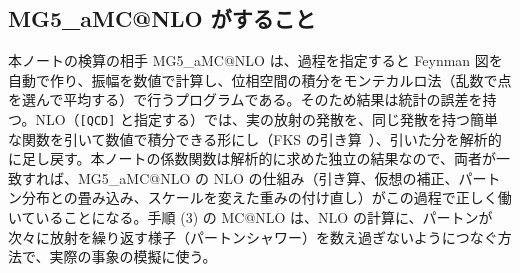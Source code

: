 \documentclass[a4paper,10pt]{ltjsarticle}
\makeatletter
\newcommand{\MGaMC}{MG5\_aMC@NLO}
\makeatother
\begin{document}
\subsection{\MGaMC{} がすること}\label{sec:mg5intro}

本ノートの検算の相手 \MGaMC{} は、過程を指定すると Feynman 図を自動で作り、振幅を数値で計算し、位相空間の積分をモンテカルロ法（乱数で点を選んで平均する）で行うプログラムである。そのため結果は統計の誤差を持つ。NLO（\texttt{[QCD]} と指定する）では、実の放射の発散を、同じ発散を持つ簡単な関数を引いて数値で積分できる形にし（FKS の引き算~\cite{fks}）、引いた分を解析的に足し戻す。本ノートの係数関数は解析的に求めた独立の結果なので、両者が一致すれば、\MGaMC{} の NLO の仕組み（引き算、仮想の補正、パートン分布との畳み込み、スケールを変えた重みの付け直し）がこの過程で正しく働いていることになる。手順 (3) の MC@NLO は、NLO の計算に、パートンが次々に放射を繰り返す様子（パートンシャワー）を数え過ぎないようにつなぐ方法で、実際の事象の模擬に使う。
\end{document}
